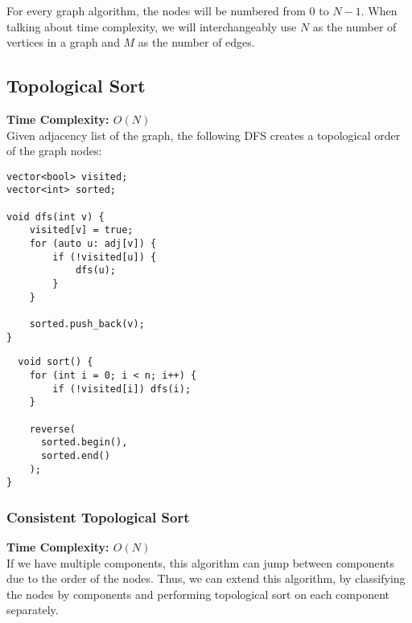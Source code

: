 For every graph algorithm, the nodes will be numbered from $0$ to $N-1$. \newline
When talking about time complexity, we will interchangeably use $N$ as the number of vertices
in a graph and $M$ as the number of edges.

\subsection{Topological Sort}

\textbf{Time Complexity: $O(N)$}
\\

Given adjacency list of the graph, the following DFS creates a topological order of the graph nodes:

\begin{center}
\begin{minipage}[t]{0.45\linewidth}
\begin{lstlisting}
vector<bool> visited;
vector<int> sorted;

void dfs(int v) {
    visited[v] = true;
    for (auto u: adj[v]) {
        if (!visited[u]) {
            dfs(u);
        }
    }

    sorted.push_back(v);
}
\end{lstlisting}
\end{minipage}
\qquad
\begin{minipage}[t]{0.45\linewidth}
\begin{lstlisting}
  void sort() {
    for (int i = 0; i < n; i++) {
        if (!visited[i]) dfs(i);
    }

    reverse(
      sorted.begin(),
      sorted.end()
    );
}
\end{lstlisting}
\end{minipage}
\end{center}

\newpage
\subsubsection{Consistent Topological Sort}

\textbf{Time Complexity: $O(N)$}
\\

If we have multiple components, this algorithm can jump
between components due to the order of the nodes. Thus, we can extend this algorithm, 
by classifying the nodes by components and performing topological sort on each component separately.

